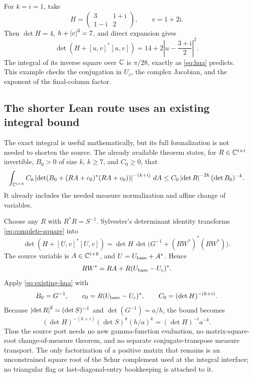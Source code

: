 \begin{remark}
For \(k=i=1\), take
\[
 H=\begin{pmatrix}3&1+\mathrm i\\1-\mathrm i&2\end{pmatrix},
 \qquad v=1+2\mathrm i.
\]
Then \(\det H=4\), \(h+\left|v\right|^2=7\), and direct expansion gives
\[
 \det(H+[u,v]^*[u,v])
   =14+2\left|u-\frac{3+\mathrm i}{2}\right|^2.
\]
The integral of its inverse square over \(\mathbb C\) is \(\pi/28\),
exactly as \eqref{eq:hua} predicts. This example checks the conjugation in \(U_c\),
the complex Jacobian, and the exponent of the final-column factor.
\end{remark}

\subsection{The shorter Lean route uses an existing integral bound}

The exact integral is useful mathematically, but its full formalization is not
needed to shorten the source. The already available theorem
states, for \(R\in\mathbb C^{i\times i}\) invertible, \(B_0>0\) of size \(k\),
\(k\geq7\), and \(C_0\geq0\), that
\begin{equation}\label{eq:existing-hua}
 \int_{\mathbb C^{i\times k}}
 C_0\left|\det(B_0+(RA+c_0)^*(RA+c_0))\right|^{-(k+i)}\,dA
 \leq C_0\left|\det R\right|^{-2k}(\det B_0)^{-k}.
\end{equation}
It already includes the needed measure normalization and affine change of variables.

Choose any \(R\) with \(R^*R=S^{-1}\). Sylvester's determinant identity transforms
\eqref{eq:complete-square} into
\begin{equation}\label{eq:old-hua-adapter}
 \det(H+[U,v]^*[U,v])
  =\det H\,
     \det\bigl(G^{-1}+(RW^*)^*(RW^*)\bigr).
\end{equation}
The source variable is \(A\in\mathbb C^{i\times k}\), and \(U=U_{\rm base}+A^*\).
Hence
\[
 RW^*=RA+R(U_{\rm base}-U_c)^*.
\]
Apply \eqref{eq:existing-hua} with
\[
 B_0=G^{-1},\qquad c_0=R(U_{\rm base}-U_c)^*,\qquad
 C_0=(\det H)^{-(k+i)}.
\]
Because \(\left|\det R\right|^2=(\det S)^{-1}\) and
\(\det(G^{-1})=a/h\), the bound becomes
\[
 (\det H)^{-(k+i)}(\det S)^k(h/a)^k
       =(\det H)^{-i}a^{-k}.
\]
Thus the source port needs no new gamma-function evaluation, no matrix-square-root
change-of-measure theorem, and no separate conjugate-transpose measure transport.
The only factorization of a positive matrix that remains is an unconstrained square
root of the Schur complement used at the integral interface; no triangular flag
or last-diagonal-entry bookkeeping is attached to it.

